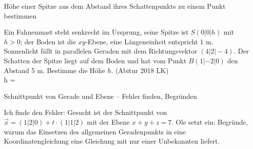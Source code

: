 \begin{aufgabe}{Höhe einer Spitze aus dem Abstand ihres Schattenpunkts zu einem Punkt bestimmen}
\begin{teile}
\teil Ein Fahnenmast steht senkrecht im Ursprung, seine Spitze ist $S(0|0|h)$ mit $h > 0$; der Boden ist die $xy$-Ebene, eine Längeneinheit entspricht 1 m. Sonnenlicht fällt in parallelen Geraden mit dem Richtungsvektor $(4|2|-4)$. Der Schatten der Spitze liegt auf dem Boden und hat vom Punkt $B(1|-2|0)$ den Abstand 5 m. Bestimme die Höhe $h$. \hfill (Abitur 2018 LK) \\ h = \leerfeld[m]
\end{teile}
\end{aufgabe}

\begin{aufgabe}{Schnittpunkt von Gerade und Ebene – Fehler finden, Begründen}
\begin{teile}
\teil Ich finde den Fehler: Gesucht ist der Schnittpunkt von $\vec{x} = (1|2|0) + t \cdot (1|1|2)$ mit der Ebene $x + y + z = 7$. Ole setzt ein: 
\teil Begründe, warum das Einsetzen des allgemeinen Geradenpunkts in eine Koordinatengleichung eine Gleichung mit nur einer Unbekannten liefert.
\end{teile}
\end{aufgabe}

